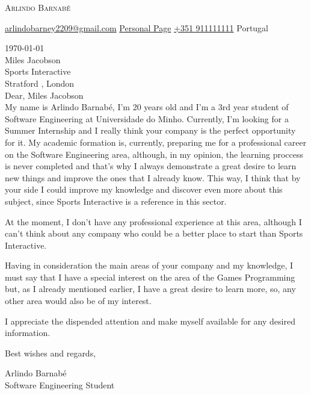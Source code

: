 \documentclass[12pt]{letter}
\makeatletter
\newcommand{\myname}{Arlindo Barnabé}
\newcommand{\mytitle}{Software Engineering Student}
\newcommand{\myemail}{arlindobarney2209@gmail.com}
\newcommand{\mypage}{https://beasrodrigues24.github.io/koala/}
\newcommand{\myphone}{+351 911111111}
\newcommand{\mylocation}{Portugal}
\newcommand{\recipient}{Miles Jacobson}
\newcommand{\greeting}{Dear, }
\newcommand{\closer}{Best wishes and regards, }
\newcommand{\company}{Sports Interactive}
\newcommand{\city}{Stratford}
\newcommand{\state}{London}
\makeatother
\begin{document}
\AddToShipoutPictureBG{
\color{gr}
\AtPageUpperLeft{\rule[-1.3in]{\paperwidth}{1.3in}}
}

\begin{center}
{\fontsize{28}{0}\selectfont\scshape \myname}

\href{mailto:\myemail}{\faEnvelope\enspace \myemail}\hfill
\href{\mypage}{\faSafari\enspace Personal Page}\hfill
\href{tel:\myphone}{\faPhone\enspace \myphone}\hfill
\faMapMarker\enspace \mylocation
\end{center}

\vspace{0.2in}

\today \\ 

\vspace{-0.1in}\recipient\\

\company\\ 
\city
, \state\\ 

\vspace{-0.1in} \greeting  \recipient\\

\vspace{-0.1in}\setlength\parindent{24pt}
\noident
My name is Arlindo Barnabé, I'm 20 years old and I'm a 3rd year student of Software Engineering at Universidade do Minho. Currently, I'm looking for a Summer Internship and I really think your company is the perfect opportunity for it.
My academic formation is, currently, preparing me for a professional career on the Software Engineering area, although, in my opinion, the learning proccess is never completed and that's why I always demonstrate a great desire to learn new things and improve the ones that I already know.
This way, I think that by your side I could improve my knowledge and discover even more about this subject, since Sports Interactive is a reference in this sector.

At the moment, I don't have any professional experience at this area, although I can't think about any company who could be a better place to start than Sports Interactive.

Having in consideration the main areas of your company and my knowledge, I must say that I have a special interest on the area of the Games Programming but, as I already mentioned earlier, I have a great desire to learn more, so, any other area would also be of my interest.

I appreciate the dispended attention and make myself available for any desired information.

\vspace{0.1in}
\vfill

\begin{flushright}
\closer

\vspace{-0.1in}\myname\\
\mytitle
\end{flushright}
\end{document}

